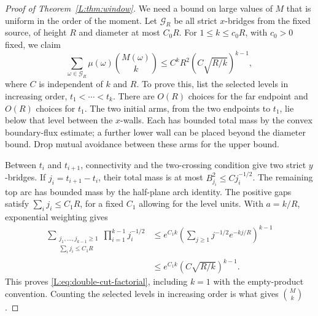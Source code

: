 \documentclass[11pt]{article}
\numberwithin{equation}{section}
\theoremstyle{definition}\newtheorem{definition}[theorem]{Definition}
\theoremstyle{remark}\newtheorem{remark}[theorem]{Remark}
\begin{document}
\begin{proof}[Proof of Theorem~\ref{L:thm:window}]
We need a bound on large values of $M$ that is uniform in the order of
the moment. Let $\mathcal G_R$ be all strict $x$-bridges from the fixed
source, of height $R$ and diameter at most $C_0R$. For
$1\le k\le c_0R$, with $c_0>0$ fixed, we claim
\begin{equation}
 \sum_{\omega\in\mathcal G_R}\mu(\omega)
       \binom{M(\omega)}{k}
 \le C^kR^2\left(C\sqrt{R/k}\right)^{k-1},
 \label{L:eq:double-cut-factorial}
\end{equation}
where $C$ is independent of $k$ and $R$.
To prove this, list the selected levels in increasing order,
$t_1<\cdots<t_k$. There are $O(R)$ choices for the far endpoint and
$O(R)$ choices for $t_1$. The two initial arms, from the two endpoints
to $t_1$, lie below that level between the $x$-walls. Each has bounded
total mass by the convex boundary-flux estimate; a further lower wall
can be placed beyond the diameter bound. Drop mutual avoidance between
these arms for the upper bound.

Between $t_i$ and $t_{i+1}$, connectivity and the two-crossing condition
give two strict $y$-bridges. If $j_i=t_{i+1}-t_i$, their total mass is
at most $B_{j_i}^2\le Cj_i^{-1/2}$. The remaining top arc has bounded
mass by the half-plane arch identity. The positive gaps satisfy
$\sum_i j_i\le C_1R$, for a fixed $C_1$ allowing for the level units.
With $a=k/R$, exponential weighting gives
\[
 \begin{aligned}
 \sum_{\substack{j_1,\ldots,j_{k-1}\ge1\\
                  \sum_i j_i\le C_1R}}
       \prod_{i=1}^{k-1}j_i^{-1/2}
 &\le e^{C_1k}
       \left(\sum_{j\ge1}j^{-1/2}e^{-kj/R}\right)^{k-1}\\
 &\le e^{C_1k}\left(C\sqrt{R/k}\right)^{k-1}.
 \end{aligned}
\]
This proves \eqref{L:eq:double-cut-factorial}, including $k=1$ with
the empty-product convention. Counting the selected levels in
increasing order is what gives $\binom Mk$.


\end{proof}
\end{document}

